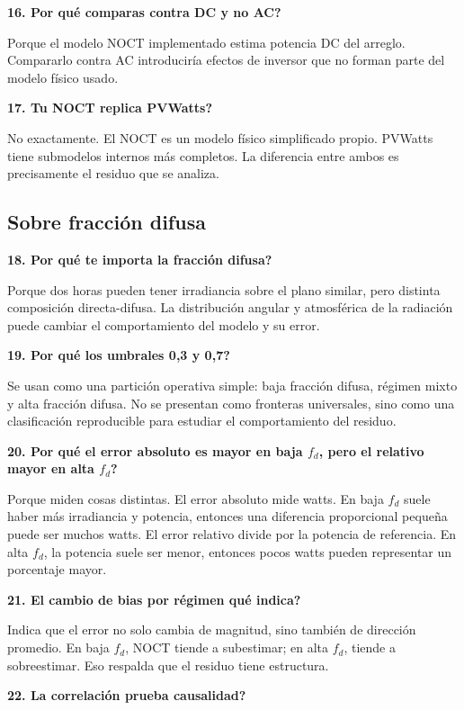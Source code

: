 \documentclass[11pt, letterpaper]{article}
\newcommand{\fd}{f_d}
\begin{document}
\textbf{16. \textquestiondown Por qu\'e comparas contra DC y no AC?}

Porque el modelo NOCT implementado estima potencia DC del arreglo. Compararlo contra AC introducir\'ia efectos de inversor que no forman parte del modelo f\'isico usado.

\textbf{17. \textquestiondown Tu NOCT replica PVWatts?}

No exactamente. El NOCT es un modelo f\'isico simplificado propio. PVWatts tiene submodelos internos m\'as completos. La diferencia entre ambos es precisamente el residuo que se analiza.

\subsection{Sobre fracci\'on difusa}

\textbf{18. \textquestiondown Por qu\'e te importa la fracci\'on difusa?}

Porque dos horas pueden tener irradiancia sobre el plano similar, pero distinta composici\'on directa-difusa. La distribuci\'on angular y atmosf\'erica de la radiaci\'on puede cambiar el comportamiento del modelo y su error.

\textbf{19. \textquestiondown Por qu\'e los umbrales 0,3 y 0,7?}

Se usan como una partici\'on operativa simple: baja fracci\'on difusa, r\'egimen mixto y alta fracci\'on difusa. No se presentan como fronteras universales, sino como una clasificaci\'on reproducible para estudiar el comportamiento del residuo.

\textbf{20. \textquestiondown Por qu\'e el error absoluto es mayor en baja \(\fd\), pero el relativo mayor en alta \(\fd\)?}

Porque miden cosas distintas. El error absoluto mide watts. En baja \(\fd\) suele haber m\'as irradiancia y potencia, entonces una diferencia proporcional peque\~na puede ser muchos watts. El error relativo divide por la potencia de referencia. En alta \(\fd\), la potencia suele ser menor, entonces pocos watts pueden representar un porcentaje mayor.

\textbf{21. \textquestiondown El cambio de bias por r\'egimen qu\'e indica?}

Indica que el error no solo cambia de magnitud, sino tambi\'en de direcci\'on promedio. En baja \(\fd\), NOCT tiende a subestimar; en alta \(\fd\), tiende a sobreestimar. Eso respalda que el residuo tiene estructura.

\textbf{22. \textquestiondown La correlaci\'on prueba causalidad?}
\end{document}
